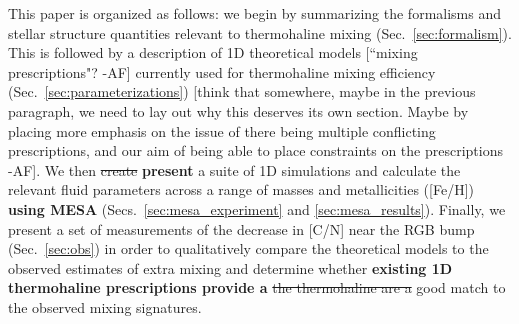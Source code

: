This paper is organized as follows: we begin by summarizing the formalisms and stellar structure quantities relevant to thermohaline mixing (Sec.~\ref{sec:formalism}). This is followed by a description of 1D theoretical models [``mixing prescriptions"? -AF] currently used for thermohaline mixing efficiency (Sec.~\ref{sec:parameterizations}) [think that somewhere, maybe in the previous paragraph, we need to lay out why this deserves its own section. Maybe by placing more emphasis on the issue of there being multiple conflicting prescriptions, and our aim of being able to place constraints on the prescriptions -AF].
We then \sout{create} \textbf{present} a suite of 1D simulations and calculate the relevant fluid parameters across a range of masses and metallicities ([Fe/H]) \textbf{using MESA} (Secs.~\ref{sec:mesa_experiment} and \ref{sec:mesa_results}).
Finally, we present a set of measurements of the decrease in [C/N] near the RGB bump (Sec.~\ref{sec:obs}) in order to qualitatively compare the theoretical models to the observed estimates of extra mixing and determine whether 
\textbf{existing 1D thermohaline prescriptions provide a}
\sout{the thermohaline %
are a} 
good match to the observed mixing signatures. 